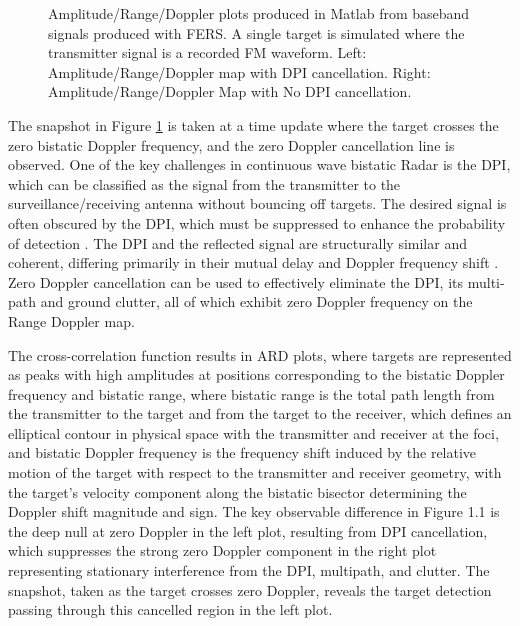 \begin{figure}[h!]
    \centering
    \begin{subfigure}[b]{0.49\linewidth}
        \centering
        
    \end{subfigure}
    \hfill
    \begin{subfigure}[b]{0.49\linewidth}
        \centering
        
    \end{subfigure}
    \caption{Amplitude/Range/Doppler plots produced in Matlab from baseband signals produced with FERS. A single target is simulated where the transmitter signal is a recorded FM waveform. Left:  Amplitude/Range/Doppler map with DPI cancellation. Right: Amplitude/Range/Doppler Map with No DPI cancellation.}
    \label{fig:ard1}
\end{figure}

The snapshot in Figure \ref{fig:ard1} is taken at a time update where the target crosses the zero bistatic Doppler frequency, and the zero Doppler cancellation line is observed. One of the key challenges in continuous wave bistatic \ac{Radar} is the \ac{DPI}, which can be classified as the signal from the transmitter to the surveillance/receiving antenna without bouncing off targets. The desired signal is often obscured by the \ac{DPI}, which must be suppressed to enhance the probability of detection \cite{Zhu2006}. The \ac{DPI} and the reflected signal are structurally similar and coherent, differing primarily in their mutual delay and Doppler frequency shift \cite{tong2014}. Zero Doppler cancellation can be used to effectively eliminate the \ac{DPI}, its multi-path and ground clutter, all of which exhibit zero Doppler frequency on the  Range  Doppler map.

The cross-correlation function results in \ac{ARD} plots, where targets are represented as peaks with high amplitudes at positions corresponding to the bistatic Doppler frequency and bistatic range, where bistatic range is the total path length from the transmitter to the target and from the target to the receiver, which defines an elliptical contour in physical space with the transmitter and receiver at the foci, and bistatic Doppler frequency is the frequency shift induced by the relative motion of the target with respect to the transmitter and receiver geometry, with the target's velocity component along the bistatic bisector determining the Doppler shift magnitude and sign. The key observable difference in Figure 1.1 is the deep null at zero Doppler in the left plot, resulting from DPI cancellation, which suppresses the strong zero Doppler component in the right plot representing stationary interference from the DPI, multipath, and clutter. The snapshot, taken as the target crosses zero Doppler, reveals the target detection passing through this cancelled region in the left plot.

